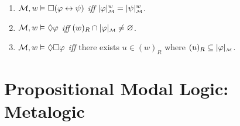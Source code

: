 \documentclass[a4paper, 11pt]{article} %
\begin{document}
\begin{enumerate}[leftmargin=1.2in,itemsep=1pt]
    \item $\M, w \MLmodels[] \Box(\metaA \leftrightarrow \metaB)$ \textit{iff} $\interpret{\M}{\metaA}^w = \interpret{\M}{\metaB}^w$.
    \item $\M, w \MLmodels[] \Diamond\metaA$ \textit{iff} $(w)_R \cap \interpret{\M}{\metaA} \neq \varnothing$.
    \item $\M, w \MLmodels[] \Diamond\Box\metaA$ \textit{iff} there exists $u \in (w)_R$ where $(u)_R \subseteq \interpret{\M}{\metaA}$.
\end{enumerate}







\section*{\sc Propositional Modal Logic: Metalogic}
\end{document}

